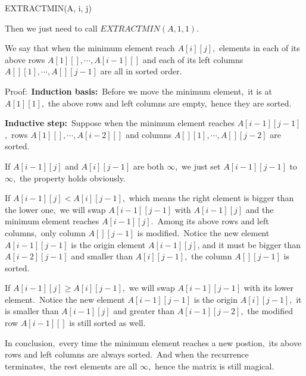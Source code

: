 \documentclass[]{article}
\begin{document}
	\begin{algorithm}[H]
		\caption{EXTRACTMIN(A, i, j)} %
		\begin{algorithmic}[1]
		\EndIf
		\Else
		\EndIf
		\end{algorithmic}
	\end{algorithm}
	Then we just need to call $EXTRACTMIN(A, 1, 1)$.
	
	We say that when the minimum element reach $A[i][j]$,\ elements in each of its above rows $A[1][], \cdots, A[i-1][]$ and each of its left columns $A[][1], \cdots, A[][j-1]$ are all in sorted order.
	
	Proof:\ \textbf{Induction basis:}\ Before we move the minimum element,\ it is at $A[1][1]$,\ the above rows and left columns are empty,\ hence they are sorted.
	
	\textbf{Inductive step:}\ Suppose when the minimum element reaches $A[i-1][j-1]$,\ rows $A[1][], \cdots, A[i-2][]$ and columns $A[][1], \cdots, A[][j-2]$ are sorted.
	
	If $A[i-1][j]$ and $A[i][j-1]$ are both $\infty$,\ we just set $A[i-1][j-1]$ to $\infty$,\ the property holds obviously. 
	
	If $A[i-1][j] < A[i][j-1]$,\ which means the right element is bigger than the lower one,\ we will swap $A[i-1][j-1]$ with $A[i-1][j]$ and the minimum element reaches $A[i-1][j]$.\ Among its above rows and left columns,\ only column $A[][j-1]$ is modified.\ Notice the new element $A[i-1][j-1]$ is the origin element $A[i-1][j]$, and it must be bigger than $A[i-2][j-1]$ and smaller than $A[i][j-1]$,\ the column $A[][j-1]$ is sorted.
	
	If $A[i-1][j] \geq A[i][j-1]$,\ we will swap $A[i-1][j-1]$ with its lower element.\ Notice the new element $A[i-1][j-1]$ is the origin $A[i][j-1]$,\ it is smaller than $A[i-1][j]$ and greater than $A[i-1][j-2]$,\ the modified row $A[i-1][]$ is still sorted as well.
	
	In conclusion,\ every time the minimum element reaches a new postion,\ its above rows and left columns are always sorted.\ And when the recurrence terminates,\ the rest elements are all $\infty$,\ hence the matrix is still magical.
	
\end{document}
